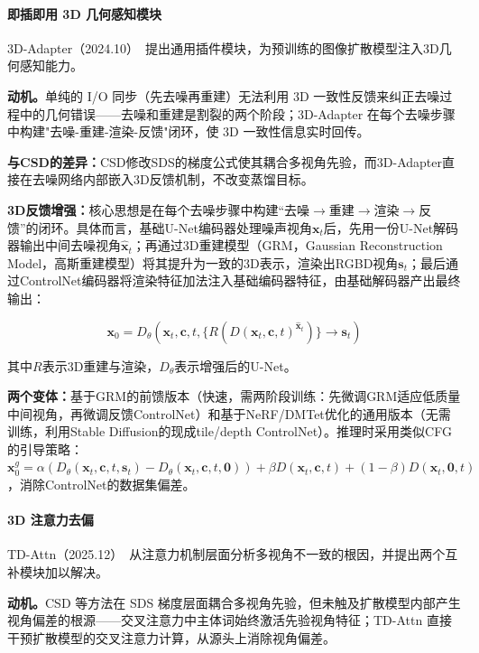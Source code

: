 \paragraph{即插即用 3D 几何感知模块}

3D-Adapter（2024.10）~\cite{2410_18974}提出通用插件模块，为预训练的图像扩散模型注入3D几何感知能力。

\textbf{动机。}单纯的 I/O 同步（先去噪再重建）无法利用 3D 一致性反馈来纠正去噪过程中的几何错误——去噪和重建是割裂的两个阶段；3D-Adapter 在每个去噪步骤中构建"去噪-重建-渲染-反馈"闭环，使 3D 一致性信息实时回传。

\textbf{与CSD的差异：}CSD修改SDS的梯度公式使其耦合多视角先验，而3D-Adapter直接在去噪网络内部嵌入3D反馈机制，不改变蒸馏目标。

\textbf{3D反馈增强：}核心思想是在每个去噪步骤中构建``去噪$\to$重建$\to$渲染$\to$反馈''的闭环。具体而言，基础U-Net编码器处理噪声视角$\mathbf{x}_t$后，先用一份U-Net解码器输出中间去噪视角$\hat{\mathbf{x}}_t$；再通过3D重建模型（GRM，Gaussian Reconstruction Model，高斯重建模型）将其提升为一致的3D表示，渲染出RGBD视角$\mathbf{s}_t$；最后通过ControlNet编码器将渲染特征加法注入基础编码器特征，由基础解码器产出最终输出：

\begin{equation}
\mathbf{x}_0 = D_\theta(\mathbf{x}_t, \mathbf{c}, t, \{R(\hat{D}(\mathbf{x}_t, \mathbf{c}, t)^{\hat{\mathbf{x}}_t})\} \to \mathbf{s}_t)
\end{equation}

其中$R$表示3D重建与渲染，$D_\theta$表示增强后的U-Net。

\textbf{两个变体：}基于GRM的前馈版本（快速，需两阶段训练：先微调GRM适应低质量中间视角，再微调反馈ControlNet）和基于NeRF/DMTet优化的通用版本（无需训练，利用Stable Diffusion的现成tile/depth ControlNet）。推理时采用类似CFG的引导策略：$\mathbf{x}_0^g = \alpha(D_\theta(\mathbf{x}_t,\mathbf{c},t,\mathbf{s}_t) - D_\theta(\mathbf{x}_t,\mathbf{c},t,\mathbf{0})) + \beta D(\mathbf{x}_t,\mathbf{c},t) + (1-\beta)D(\mathbf{x}_t,\mathbf{0},t)$，消除ControlNet的数据集偏差。

\paragraph{3D 注意力去偏}

TD-Attn（2025.12）~\cite{2512_07345}从注意力机制层面分析多视角不一致的根因，并提出两个互补模块加以解决。

\textbf{动机。}CSD 等方法在 SDS 梯度层面耦合多视角先验，但未触及扩散模型内部产生视角偏差的根源——交叉注意力中主体词始终激活先验视角特征；TD-Attn 直接干预扩散模型的交叉注意力计算，从源头上消除视角偏差。

